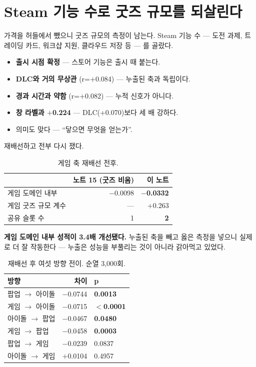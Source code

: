 \documentclass[10pt]{article}
\begin{document}
\section{Steam 기능 수로 굿즈 규모를 되살린다}

가격을 허들에서 뺐으니 굿즈 규모의 측정이 남는다. Steam 기능 수 --- 도전 과제,
트레이딩 카드, 워크샵 지원, 클라우드 저장 등 --- 를 골랐다.

\begin{itemize}[leftmargin=1.1em,itemsep=0.15em]
\item \textbf{출시 시점 확정} --- 스토어 기능은 출시 때 붙는다.
\item \textbf{DLC와 거의 무상관} (r=$+$0.084) --- 누출된 축과 독립이다.
\item \textbf{경과 시간과 약함} (r=$+$0.082) --- 누적 신호가 아니다.
\item \textbf{창 라벨과 $+$0.224} --- DLC(+0.070)보다 세 배 강하다.
\item 의미도 맞다 --- ``닿으면 무엇을 얻는가''.
\end{itemize}

재배선하고 전부 다시 쟀다.

\begin{table}[t]
\centering\tsize
\caption{게임 축 재배선 전후.}
\begin{tabular}{lrr}
\toprule
& 노트 15 (굿즈 비움) & 이 노트 \\
\midrule
게임 도메인 내부 & $-$0.0098 & \textbf{$-$0.0332} \\
게임 굿즈 규모 계수 & --- & $+$0.263 \\
공유 슬롯 수 & 1 & \textbf{2} \\
\bottomrule
\end{tabular}
\end{table}

\textbf{게임 도메인 내부 성적이 3.4배 개선됐다.} 누출된 축을 빼고 옳은 측정을
넣으니 실제로 더 잘 작동한다 --- 누출은 성능을 부풀리는 것이 아니라 갉아먹고
있었다.

\begin{table}[t]
\centering\tsize
\caption{재배선 후 여섯 방향 전이. 순열 3,000회.}
\begin{tabular}{lrl}
\toprule
방향 & 차이 & p \\
\midrule
팝업 $\to$ 아이돌 & $-$0.0744 & \textbf{0.0013} \\
게임 $\to$ 아이돌 & $-$0.0715 & \textbf{$<$0.0001} \\
아이돌 $\to$ 팝업 & $-$0.0467 & \textbf{0.0480} \\
게임 $\to$ 팝업 & $-$0.0458 & \textbf{0.0003} \\
팝업 $\to$ 게임 & $-$0.0239 & 0.0837 \\
아이돌 $\to$ 게임 & $+$0.0104 & 0.4957 \\
\bottomrule
\end{tabular}
\end{table}
\end{document}
